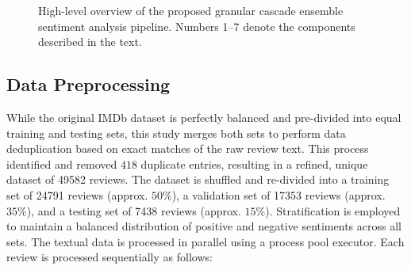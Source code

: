 \documentclass[a4paper,fleqn]{cas-dc}
\begin{document}
\begin{figure}[htbp]
	\caption{High-level overview of the proposed granular cascade ensemble sentiment analysis pipeline. Numbers 1--7 denote the components described in the text.}
	\label{fig:pipeline}
\end{figure}

\subsection{Data Preprocessing} \label{sec:preprocessing}

While the original IMDb dataset is perfectly balanced and pre-divided into equal training and testing sets, this study merges both sets to perform data deduplication based on exact matches of the raw review text. This process identified and removed $418$ duplicate entries, resulting in a refined, unique dataset of \num{49582} reviews. The dataset is shuffled and re-divided into a training set of \num{24791} reviews (approx. $50\%$), a validation set of \num{17353} reviews (approx. $35\%$), and a testing set of \num{7438} reviews (approx. $15\%$). Stratification is employed to maintain a balanced distribution of positive and negative sentiments across all sets. The textual data is processed in parallel using a process pool executor. Each review is processed sequentially as follows:
\end{document}
